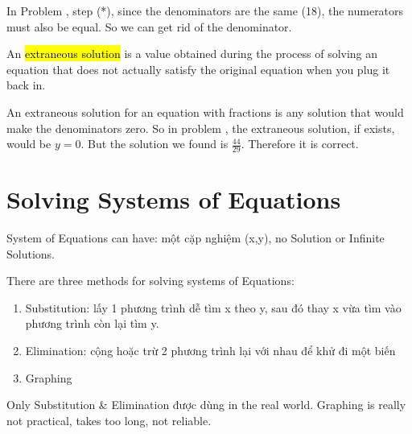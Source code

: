 In Problem , step (*), since the denominators are the same (18), the numerators must also be equal. So we can get rid of the denominator.

\vspace{.4cm}

An \hl{extraneous solution} is a value obtained during the process of solving an equation that does not actually satisfy the original equation when you plug it back in.

An extraneous solution for an equation with fractions is any solution that would make the denominators zero. So in problem , the extraneous solution, if exists, would be $y=0$. But the solution we found is $\frac{44}{29}$. Therefore it is correct.

\section{Solving Systems of Equations}

%
%

System of Equations can have: một cặp nghiệm (x,y), no Solution or Infinite Solutions.

\vspace{.4cm}

There are three methods for solving systems of Equations:

\begin{enumerate}
  \item Substitution: lấy 1 phương trình dễ tìm x theo y, sau đó thay x vừa tìm vào phương trình còn lại tìm y.
  \item Elimination: cộng hoặc trừ 2 phương trình lại với nhau để khử đi một biến
  \item Graphing
\end{enumerate}

Only Substitution \& Elimination được dùng in the real world. Graphing is really not practical, takes too long, not reliable.


